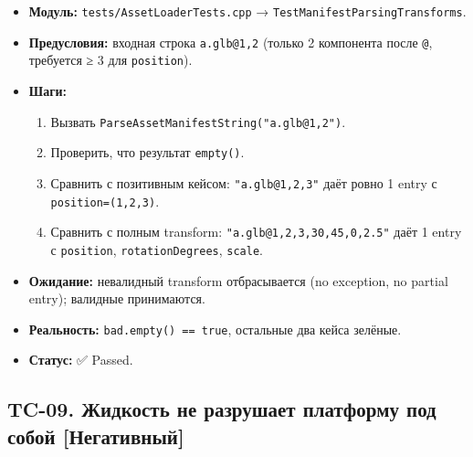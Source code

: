 \documentclass[
  11pt,a4paper,oneside]{article}
\providecommand{\tightlist}{%
  \setlength{\itemsep}{0pt}\setlength{\parskip}{0pt}}
\providecommand{\tightlist}{%
  \setlength{\itemsep}{0pt}\setlength{\parskip}{0pt}}
\begin{document}
\begin{itemize}
\tightlist
\item
  \textbf{Модуль:} \texttt{tests/AssetLoaderTests.cpp} → \texttt{TestManifestParsingTransforms}.
\item
  \textbf{Предусловия:} входная строка \texttt{a.glb@1,2} (только 2 компонента после \texttt{@}, требуется ≥ 3 для \texttt{position}).
\item
  \textbf{Шаги:}

  \begin{enumerate}
  \def\labelenumi{\arabic{enumi}.}
  \tightlist
  \item
    Вызвать \texttt{ParseAssetManifestString("a.glb@1,2")}.
  \item
    Проверить, что результат \texttt{empty()}.
  \item
    Сравнить с позитивным кейсом: \texttt{"a.glb@1,2,3"} даёт ровно 1 entry с \texttt{position=(1,2,3)}.
  \item
    Сравнить с полным transform: \texttt{"a.glb@1,2,3,30,45,0,2.5"} даёт 1 entry с \texttt{position}, \texttt{rotationDegrees}, \texttt{scale}.
  \end{enumerate}
\item
  \textbf{Ожидание:} невалидный transform отбрасывается (no exception, no partial entry); валидные принимаются.
\item
  \textbf{Реальность:} \texttt{bad.empty()\ ==\ true}, остальные два кейса зелёные.
\item
  \textbf{Статус:} ✅ Passed.
\end{itemize}

\subsection{TC-09. Жидкость не разрушает платформу под собой {[}Негативный{]}}\label{tc-09-ux436ux438ux434ux43aux43eux441ux442ux44c-ux43dux435-ux440ux430ux437ux440ux443ux448ux430ux435ux442-ux43fux43bux430ux442ux444ux43eux440ux43cux443-ux43fux43eux434-ux441ux43eux431ux43eux439-ux43dux435ux433ux430ux442ux438ux432ux43dux44bux439}
\end{document}
